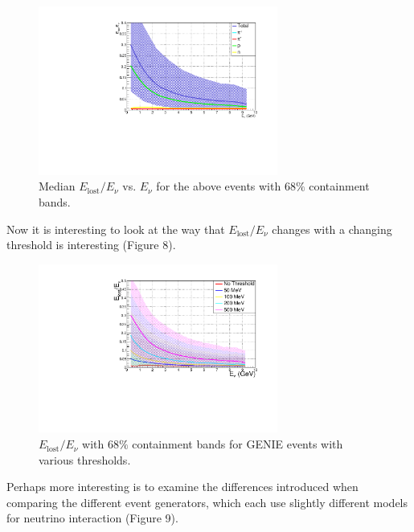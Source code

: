 \documentclass{article}
\begin{document}
\begin{figure}[!h]
  \begin{center}
    \includegraphics[width=0.7\textwidth]{plots.old/fig12.pdf}
    \caption{Median $E_{\mathrm{lost}}/E_\nu$ vs. $E_\nu$ for the above events with $68\%$ containment bands.}
  \end{center}
\end{figure}

Now it is interesting to look at the way that $E_{\mathrm{lost}}/E_\nu$ changes with a changing threshold is interesting (Figure 8).

\begin{figure}[!h]
  \begin{center}
    \includegraphics[width=0.7\textwidth]{plots.old/fig13.pdf}
    \caption{$E_{\mathrm{lost}}/E_\nu$ with $68\%$ containment bands for GENIE events with various thresholds.}
  \end{center}
\end{figure}

Perhaps more interesting is to examine the differences introduced when comparing the different event generators, which each use slightly different models for neutrino interaction (Figure 9).
\end{document}
